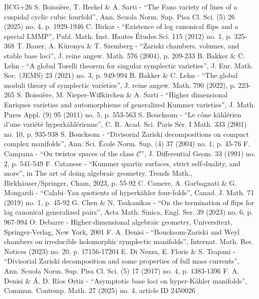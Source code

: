 \documentclass[10pt]{amsart}
\theoremstyle{plain}
\theoremstyle{definition}
\begin{document}
\begin{thebibliography}{BCG+26}
 S. Boissière, T. Heckel \& A. Sarti - “The Fano variety of lines of a cuspidal cyclic cubic fourfold”, Ann. Scuola Norm. Sup. Pisa Cl. Sci. (5) 26 (2025) no. 4, p. 1929-1946
 C. Birkar - “Existence of log canonical flips and a special LMMP”, Publ. Math. Inst. Hautes Études Sci. 115 (2012) no. 1, p. 325-368
 T. Bauer, A. Küronya \& T. Szemberg - “Zariski chambers, volumes, and stable base loci”, J. reine angew. Math. 576 (2004), p. 209-233
 B. Bakker \& C. Lehn - “A global Torelli theorem for singular symplectic varieties”, J. Eur. Math. Soc. (JEMS) 23 (2021) no. 3, p. 949-994
 B. Bakker \& C. Lehn - “The global moduli theory of symplectic varieties”, J. reine angew. Math. 790 (2022), p. 223-265
 S. Boissière, M. Nieper-Wißkirchen \& A. Sarti - “Higher dimensional Enriques varieties and automorphisms of generalized Kummer varieties”, J. Math. Pures Appl. (9) 95 (2011) no. 5, p. 553-563
 S. Boucksom - “Le cône kählérien d’une variété hyperkählérienne”, C. R. Acad. Sci. Paris Sér. I Math. 333 (2001) no. 10, p. 935-938
 S. Boucksom - “Divisorial Zariski decompositions on compact complex manifolds”, Ann. Sci. École Norm. Sup. (4) 37 (2004) no. 1, p. 45-76
 F. Campana - “On twistor spaces of the class $\mathscr{C}$”, J. Differential Geom. 33 (1991) no. 2, p. 541-549
 F. Catanese - “Kummer quartic surfaces, strict self-duality, and more”, in The art of doing algebraic geometry, Trends Math., Birkhäuser/Springer, Cham, 2023, p. 55-92
 C. Camere, A. Garbagnati \& G. Mongardi - “Calabi–Yau quotients of hyperkähler four-folds”, Canad. J. Math. 71 (2019) no. 1, p. 45-92
 G. Chen \& N. Tsakanikas - “On the termination of flips for log canonical generalized pairs”, Acta Math. Sinica, Engl. Ser. 39 (2023) no. 6, p. 967-994
 O. Debarre - Higher-dimensional algebraic geometry, Universitext, Springer-Verlag, New York, 2001
 F. A. Denisi - “Boucksom-Zariski and Weyl chambers on irreducible holomorphic symplectic manifolds”, Internat. Math. Res. Notices (2023) no. 20, p. 17156-17204
 E. Di Nezza, E. Floris \& S. Trapani - “Divisorial Zariski decomposition and some properties of full mass currents”, Ann. Scuola Norm. Sup. Pisa Cl. Sci. (5) 17 (2017) no. 4, p. 1383-1396
 F. A. Denisi \& Á. D. Ríos Ortiz - “Asymptotic base loci on hyper-Kähler manifolds”, Commun. Contemp. Math. 27 (2025) no. 4, article ID 2450026

\end{thebibliography}
\end{document}
